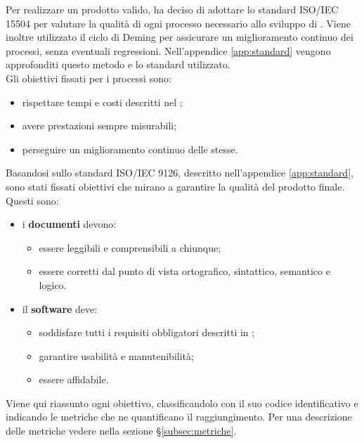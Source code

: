 		
			Per realizzare un prodotto valido, \GroupName{} ha deciso di adottare lo standard 
			ISO/IEC 15504 per valutare la qualità di ogni processo necessario allo sviluppo di 
			\ProjectName{}. Viene inoltre utilizzato il ciclo di Deming per assicurare un 
			miglioramento continuo dei processi, senza eventuali regressioni. Nell'appendice \ref{app:standard}
			vengono approfonditi questo metodo e lo standard utilizzato.\\			
			
			Gli obiettivi fissati per i processi sono:
				\begin{itemize}
					\item rispettare tempi e costi descritti nel \vPianoDiProgetto{};
					\item avere prestazioni sempre misurabili;
					\item perseguire un miglioramento continuo delle stesse.
				\end{itemize}

		
			Basandosi sullo standard ISO/IEC 9126, descritto nell'appendice \ref{app:standard}, 
			sono stati fissati obiettivi che mirano a garantire la qualità del prodotto finale. Questi sono:
				\begin{itemize}
					\item i \textbf{documenti} devono:
					\begin{itemize}
						\item essere leggibili e comprensibili a chiunque;
						\item essere corretti dal punto di vista ortografico, sintattico, semantico e logico.
					\end{itemize}
					\item il \textbf{software} deve:
					\begin{itemize}
						\item soddisfare tutti i requisiti obbligatori descritti in \vAnalisiDeiRequisiti{};
						\item garantire usabilità e manutenibilità;
						\item essere affidabile.	
					\end{itemize}
				\end{itemize}

		
			Viene qui riassunto ogni obiettivo, classificandolo con il suo codice identificativo e 
			indicando le metriche che ne quantificano il raggiungimento. Per una 
			descrizione delle metriche vedere nella sezione §\ref{subsec:metriche}. \\

